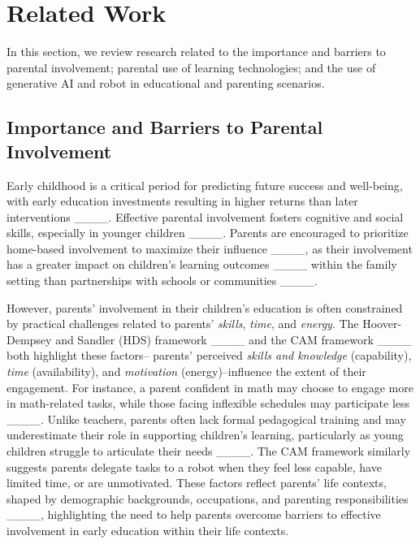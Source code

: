 \section{Related Work}
In this section, we review research related to the importance and barriers to parental involvement; parental use of learning technologies; and the use of generative AI and robot in educational and parenting scenarios.

\subsection{Importance and Barriers to Parental Involvement}\label{sec-rw-2.1}

Early childhood is a critical period for predicting future success and well-being, with early education investments resulting in higher returns than later interventions ____. Effective parental involvement fosters cognitive and social skills, especially in younger children ____. Parents are encouraged to prioritize home-based involvement to maximize their influence ____, as their involvement has a greater impact on children's learning outcomes ____ within the family setting than partnerships with schools or communities ____.

However, parents' involvement in their children's education is often constrained by practical challenges related to parents' \textit{skills}, \textit{time}, and \textit{energy}. The Hoover-Dempsey and Sandler (HDS) framework ____ and the CAM framework ____ both highlight these factors-- parents' perceived \textit{skills and knowledge} (capability), \textit{time} (availability), and \textit{motivation} (energy)--influence the extent of their engagement. For instance, a parent confident in math may choose to engage more in math-related tasks, while those facing inflexible schedules may participate less ____. Unlike teachers, parents often lack formal pedagogical training and may underestimate their role in supporting children's learning, particularly as young children struggle to articulate their needs ____. The CAM framework similarly suggests parents delegate tasks to a robot when they feel less capable, have limited time, or are unmotivated. These factors reflect parents' life contexts, shaped by demographic backgrounds, occupations, and parenting responsibilities ____, highlighting the need to help parents overcome barriers to effective involvement in early education within their life contexts.

